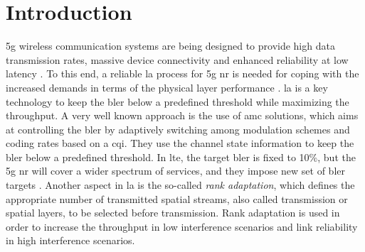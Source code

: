 \glsresetall[\acronymtype]
%
\chapter{Introduction} \label{chp:introduction}
\Gls{5g} wireless communication systems are being designed to provide high data transmission rates, massive device connectivity and enhanced reliability at low latency \cite{Amin_2016}.
%
To this end, a reliable \gls{la} process for \gls{5g} \gls{nr} is needed for coping with the increased demands in terms of the physical layer performance \cite{chu01}.
%
\Gls{la} is a key technology to keep the \gls{bler} below a predefined threshold while maximizing the throughput.
%
%
%
A very well known approach is the use of \gls{amc} solutions, which aims at controlling the \gls{bler} by adaptively switching among modulation schemes and coding rates based on a \gls{cqi}.
%
They use the channel state information to keep the \gls{bler} below a predefined threshold.
%
In \gls{lte}, the target \gls{bler} is fixed to 10\%, but the \gls{5g} \gls{nr} will cover a wider spectrum of services, and they impose new set of \gls{bler} targets \cite{Amin_2016,fantacci2009adaptive}.
%
Another aspect in \gls{la} is the so-called \textit{rank adaptation}, which defines the appropriate number of transmitted spatial streams, also called transmission or spatial layers, to be selected before transmission.
%
Rank adaptation is used in order to increase the throughput in low interference scenarios and link reliability in high interference scenarios.

%
%

